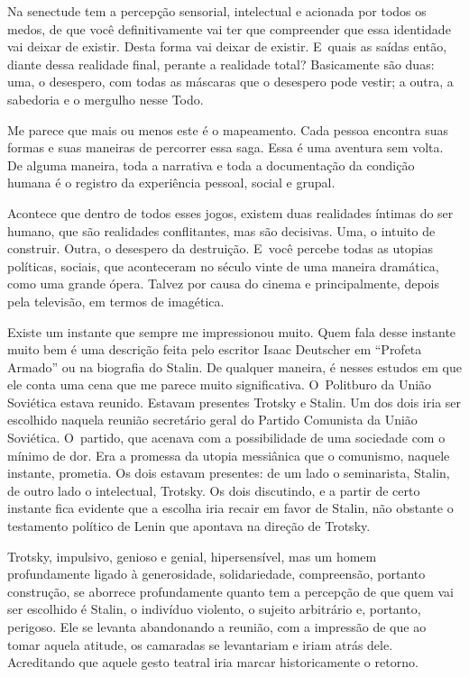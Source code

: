  

Na senectude tem a percepção sensorial, intelectual e acionada por todos
os medos, de que você definitivamente vai ter que compreender que essa
identidade vai deixar de existir. Desta forma vai deixar de existir. E~quais as saídas então, diante dessa realidade final, perante a realidade
total? Basicamente são duas: uma, o desespero, com todas as máscaras que
o desespero pode vestir; a outra, a sabedoria e o mergulho nesse Todo.

Me parece que mais ou menos este é o mapeamento. Cada pessoa encontra
suas formas e suas maneiras de percorrer essa saga. Essa é uma aventura
sem volta. De alguma maneira, toda a narrativa e toda a documentação da
condição humana é o registro da experiência pessoal, social e grupal.

 

Acontece que dentro de todos esses jogos, existem duas realidades
íntimas do ser humano, que são realidades conflitantes, mas são
decisivas. Uma, o intuito de construir. Outra, o desespero da
destruição. E~você percebe todas as utopias políticas, sociais, que
aconteceram no século vinte de uma maneira dramática, como uma grande
ópera. Talvez por causa do cinema e principalmente, depois pela
televisão, em termos de imagética.

 

Existe um instante que sempre me impressionou muito. Quem fala desse
instante muito bem é uma descrição feita pelo escritor Isaac Deutscher
em ``Profeta Armado'' ou na biografia do Stalin. De qualquer maneira, é
nesses estudos em que ele conta uma cena que me parece muito
significativa. O~Politburo da União Soviética estava reunido. Estavam
presentes Trotsky e Stalin. Um dos dois iria ser escolhido naquela
reunião secretário geral do Partido Comunista da União Soviética. O~partido, que acenava com a possibilidade de uma sociedade com o mínimo
de dor. Era a promessa da utopia messiânica que o comunismo, naquele
instante, prometia. Os dois estavam presentes: de um lado o seminarista,
Stalin, de outro lado o intelectual, Trotsky. Os dois discutindo, e a
partir de certo instante fica evidente que a escolha iria recair em
favor de Stalin, não obstante o testamento político de Lenin que
apontava na direção de Trotsky.

 

Trotsky, impulsivo, genioso e genial, hipersensível, mas um homem
profundamente ligado à generosidade, solidariedade, compreensão,
portanto construção, se aborrece profundamente quanto tem a percepção de
que quem vai ser escolhido é Stalin, o indivíduo violento, o sujeito
arbitrário e, portanto, perigoso. Ele se levanta abandonando a reunião,
com a impressão de que ao tomar aquela atitude, os camaradas se
levantariam e iriam atrás dele. Acreditando que aquele gesto teatral
iria marcar historicamente o retorno.

